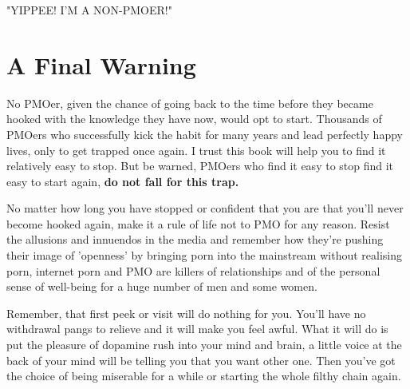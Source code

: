 \documentclass[easypeasy.tex]{subfiles}
\begin{document}
{\huge "YIPPEE! I'M A NON-PMOER!"}

\section{A Final Warning}

No PMOer, given the chance of going back to the time before they became hooked with the knowledge they have now, would opt to start. Thousands of PMOers who successfully kick the habit for many years and lead perfectly happy lives, only to get trapped once again. I trust this book will help you to find it relatively easy to stop. But be warned, PMOers who find it easy to stop find it easy to start again, \textbf{do not fall for this trap.}

No matter how long you have stopped or confident that you are that you'll never become hooked again, make it a rule of life not to PMO for any reason. Resist the allusions and innuendos in the media and remember how they're pushing their image of 'openness' by bringing porn into the mainstream without realising porn, internet porn and PMO are killers of relationships and of the personal sense of well-being for a huge number of men and some women.

Remember, that first peek or visit will do nothing for you. You'll have no withdrawal pangs to relieve and it will make you feel awful. What it will do is put the pleasure of dopamine rush into your mind and brain, a little voice at the back of your mind will be telling you that you want other one. Then you've got the choice of being miserable for a while or starting the whole filthy chain again.
\end{document}
